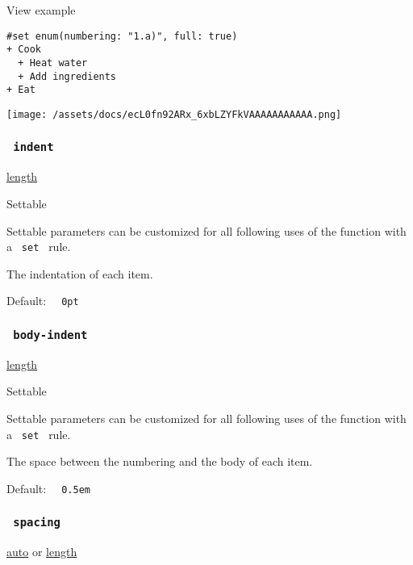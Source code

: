
View example

\begin{verbatim}
#set enum(numbering: "1.a)", full: true)
+ Cook
  + Heat water
  + Add ingredients
+ Eat
\end{verbatim}

\texttt{[image: /assets/docs/ecL0fn92ARx\_6xbLZYFkVAAAAAAAAAAA.png]}

\subsubsection{\texorpdfstring{\texttt{\ indent\ }}{ indent }}\label{parameters-indent}

\href{/docs/reference/layout/length/}{length}

{{ Settable }}

\label{parameters-indent-settable-tooltip}
Settable parameters can be customized for all following uses of the
function with a \texttt{\ set\ } rule.

The indentation of each item.

Default: \texttt{\ }{\texttt{\ 0pt\ }}\texttt{\ }

\subsubsection{\texorpdfstring{\texttt{\ body-indent\ }}{ body-indent }}\label{parameters-body-indent}

\href{/docs/reference/layout/length/}{length}

{{ Settable }}

\label{parameters-body-indent-settable-tooltip}
Settable parameters can be customized for all following uses of the
function with a \texttt{\ set\ } rule.

The space between the numbering and the body of each item.

Default: \texttt{\ }{\texttt{\ 0.5em\ }}\texttt{\ }

\subsubsection{\texorpdfstring{\texttt{\ spacing\ }}{ spacing }}\label{parameters-spacing}

\href{/docs/reference/foundations/auto/}{auto} {or}
\href{/docs/reference/layout/length/}{length}


